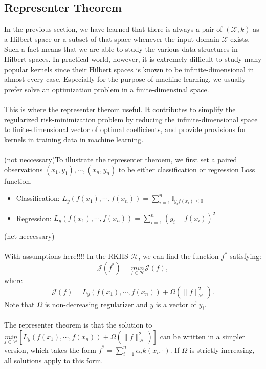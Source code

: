 \subsection{Representer Theorem}
In the previous section, we have learned that there is always a pair of $(\mathcal{X},k)$ as a Hilbert space or a subset of that space whenever the input domain $\mathcal{X}$ exists. Such a fact means that we are able to study the various data structures in Hilbert spaces. 
In practical world, however, it is extremely difficult to study many popular kernels since their Hilbert spaces is known to be infinite-dimensional in almost every case. Especially for the purpose of machine learning, we usually prefer solve an optimization problem in a finite-dimensinal space. 
\\ \\
This is where the representer therom useful. It contributes to simplify the regularized risk-minimization problem by reducing the infinite-dimensional space to finite-dimensional vector of optimal coefficients, and provide provisions for kernels in training data in machine learning.
\\ \\
(not neccessary)To illustrate the representer theroem, we first set a paired observations $(x_1,y_1),\cdots,(x_n,y_n)$ to be either classification or regression Loss function. 
\begin{itemize}
    \item Classification: $L_y(f(x_1),\cdots,f(x_n))=\sum_{i=1}^n \mathbb{I}_{y_i f(x_i)\leq0}$
    \item Regression: $L_y(f(x_1),\cdots,f(x_n))=\sum_{i=1}^n(y_i-f(x_i))^2$
\end{itemize}
(net neccessary)
\\ \\
With assumptions here!!!!
In the RKHS $\mathcal{H}$, we can find the function $f^{*}$ satisfying:
\begin{equation*}
    \mathcal{J}(f^{*})=\underset{f\in\mathcal{H}}{min}\mathcal{J}(f),
\end{equation*}
where 
\begin{equation*}
    \mathcal{J}(f)=L_y(f(x_1),\cdots,f(x_n))+\Omega(\parallel f \parallel_\mathcal{H}^2).
\end{equation*}
Note that $\Omega$ is non-decreasing regularizer and $y$ is a vector of $y_i$. 
\\ \\
The representer theorem is that the solution to $\underset{f\in\mathcal{H}}{min}[L_y(f(x_1),\cdots,f(x_n))+\Omega(\parallel f \parallel_\mathcal{H}^2)]$ can 
be written in a simpler version, which takes the form $f^{*}=\sum_{i=1}^n\alpha_i k(x_i,\cdot)$. If $\Omega$ is strictly increasing, all solutions apply to this form. 


